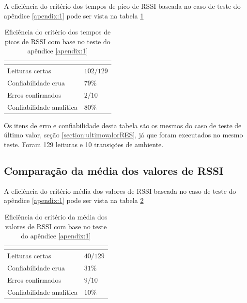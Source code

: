 A eficiência do critério dos tempos de pico de RSSI baseada no caso de teste do apêndice \ref{apendix:1} pode ser vista na tabela \ref{tab:resultados2}

\begin{table}[H]
\centering
\caption{Eficiência do critério dos tempos de picos de RSSI com base no teste do apêndice \ref{apendix:1} }
\label{tab:resultados2}
\begin{tabular}{p{5cm} p{5cm}}
\hline
\multicolumn{2}{c}{\cellcolor{lightgray}{Eficiência do critério: Tempos de pico de RSSI}} \\ \hline
Leituras certas         &   $102 / 129$        \\
Confiabilidade crua    &   $79\%$     \\
Erros confirmados          &  $2 / 10$        \\
Confiabilidade analítica & $80\%$ \\ \hline
\end{tabular}
\end{table}

Os itens de erro e confiabilidade desta tabela são os mesmos do caso de teste de último valor, seção \ref{section:ultimovalorRES}, já que foram executados no mesmo teste. Foram 129 leituras e 10 transições de ambiente.


\subsection{Comparação da média dos valores de RSSI}

A eficiência do critério média dos valores de RSSI baseada no caso de teste do apêndice \ref{apendix:1} pode ser vista na tabela \ref{tab:resultados3}

\begin{table}[H]
\centering
\caption{Eficiência do critério da média dos valores de RSSI com base no teste do apêndice \ref{apendix:1} }
\label{tab:resultados3}
\begin{tabular}{p{5cm} p{5cm}}
\hline
\multicolumn{2}{c}{\cellcolor{lightgray}{Eficiência do critério: Média dos valores de RSSI}} \\ \hline
Leituras certas         &   $40 / 129$        \\
Confiabilidade crua    &   $31\%$     \\
Erros confirmados          &  $9 / 10$        \\
Confiabilidade analítica & $10\%$ \\ \hline
\end{tabular}
\end{table}

